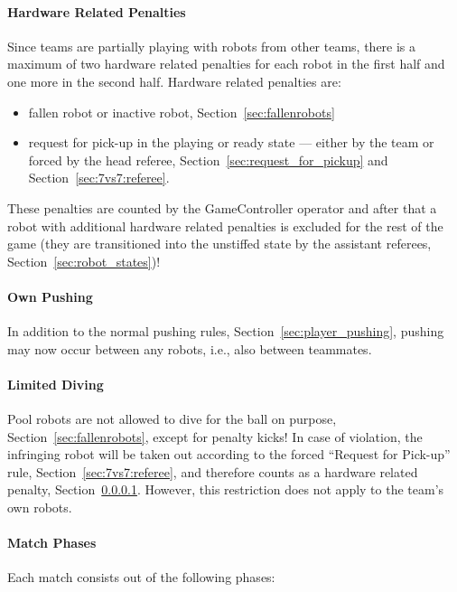         \paragraph{Hardware Related Penalties}
            \label{sec:7vs7:hardware_related_penalties}
            Since teams are partially playing with robots from other teams, there is a maximum of two hardware related penalties for each robot in the first half and one more in the second half.
            Hardware related penalties are:
            \begin{itemize}
                \item fallen robot or inactive robot, \cf Section~\ref{sec:fallenrobots}
                \item request for pick-up in the playing or ready state — either by the team or forced by the head referee, \cf Section~\ref{sec:request_for_pickup} and Section~\ref{sec:7vs7:referee}.
            \end{itemize}
            These penalties are counted by the GameController operator and after that a robot with additional hardware related penalties is excluded for the rest of the game (they are transitioned into the unstiffed state by the assistant referees, \cf Section~\ref{sec:robot_states})!

        \paragraph{Own Pushing}
            In addition to the normal pushing rules, \cf Section~\ref{sec:player_pushing}, pushing may now occur between any robots, i.e., also between teammates.

        \paragraph{Limited Diving}
            Pool robots are not allowed to dive for the ball on purpose, \cf Section~\ref{sec:fallenrobots}, except for penalty kicks! In case of violation, the infringing robot will be taken out according to the forced ``Request for Pick-up'' rule, \cf Section~\ref{sec:7vs7:referee}, and therefore counts as a hardware related penalty, \cf Section~\ref{sec:7vs7:hardware_related_penalties}. However, this restriction does not apply to the team's own robots.

        \paragraph{Match Phases}
            Each match consists out of the following phases:
